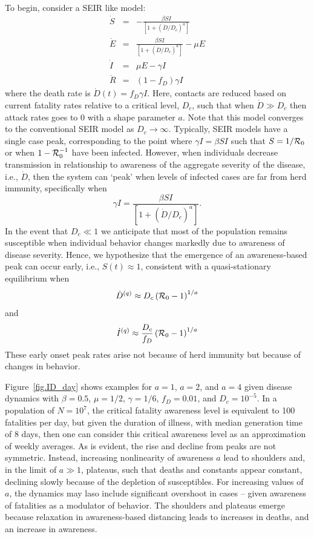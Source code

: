 To begin, consider a SEIR like model:
\begin{eqnarray}
\dot{S} &=& -\frac{\beta SI}{\left[1+\left(\dot{D}/D_c\right)^{a}\right]}\\
\dot{E} &=& \frac{\beta SI}{\left[1+\left(\dot{D}/D_c\right)^{a}\right]}-\mu E\\
\dot{I} &=& \mu E-\gamma I \\
\dot{R} &=& (1-f_D)\gamma I
\end{eqnarray}
where the death rate is $\dot{D}(t)=f_D\gamma I$.  Here, contacts
are reduced based on current fatality rates relative 
to a critical level, $D_c$, such that when $\dot{D}\gg D_c$ then
attack rates goes to 0 with a shape parameter $a$. Note that this
model converges to the conventional SEIR model as $D_c\rightarrow \infty$.
Typically, SEIR models have a single case peak, corresponding 
to the point where $\gamma I = \beta S I $ such that 
$S=1/{\cal{R}}_0$ or when $1-{\cal{R}}_0^{-1}$ have been infected.
However, when individuals decrease transmission in relationship
to awareness of the aggregate severity of the disease, i.e., $\dot{D}$, 
then the system can `peak' when levels of infected cases are
far from herd immunity, specifically when
\begin{equation}
\gamma I = \frac{\beta SI}{\left[1+\left(\dot{D}/D_c\right)^{a}\right]}.
\end{equation}
In the event that $D_c\ll 1$ we anticipate that most of the population
remains susceptible when individual behavior changes markedly
due to awareness of disease severity. Hence, we hypothesize that the
emergence of an
awareness-based peak can occur early, i.e., $S(t)\approx 1$, consistent
with a quasi-stationary equilibrium when
\begin{equation}
\dot{D}^{(q)} \approx D_c\left({\cal{R}}_0-1\right)^{1/a}
\end{equation}
and
\begin{equation}
\dot{I}^{(q)} \approx \frac{D_c}{f_D}\left({\cal{R}}_0-1\right)^{1/a}
\end{equation}
These early onset peak rates arise not because
of herd immunity but because of changes in behavior. 

Figure~\ref{fig.ID_day} shows examples for $a=1$, $a=2$, and $a=4$
given disease dynamics with $\beta=0.5$, $\mu=1/2$, $\gamma=1/6$,
$f_D=0.01$, and $D_c=10^{-5}$.  In a population of $N=10^7$, the
critical fatality awareness level is equivalent to 100 fatalities
per day, but given the duration of illness, with median generation
time of 8 days, then one can consider this critical awareness
level as an approximation of weekly averages. 
As is evident, the rise and decline from peaks are not symmetric. Instead,
increasing nonlinearity of awareness
$a$ lead to shoulders and, in the limit of $a\gg 1$, plateaus, such that
deaths and constants appear constant, declining slowly because of the
depletion of susceptibles.  For increasing values of $a$, the
dynamics may laso include significant overshoot in cases -- given
awareness of fatalities as a modulator of behavior.
The shoulders and plateaus emerge because relaxation in awareness-based
distancing leads to increases in deaths, and an increase in awareness.

